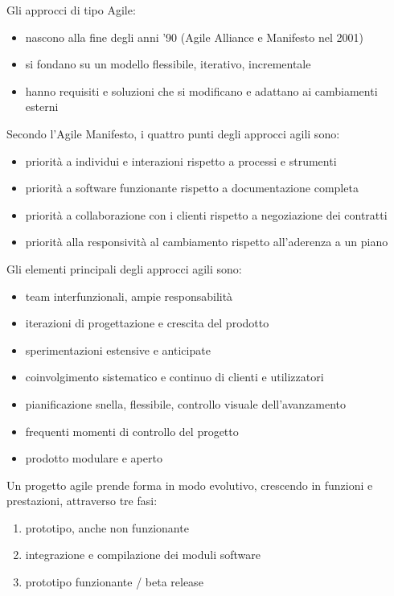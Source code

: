 \documentclass[answers, a4paper, 11pt]{exam}
\begin{document}
Gli approcci di tipo Agile:

\begin{itemize}
    \item nascono alla fine degli anni '90 (Agile Alliance e Manifesto nel 2001)
    \item si fondano su un modello flessibile, iterativo, incrementale
    \item hanno requisiti e soluzioni che si modificano e adattano ai cambiamenti esterni
    \end{itemize}
    
Secondo l'Agile Manifesto, i quattro punti degli approcci agili sono:

\begin{itemize}
    \item priorità a individui e interazioni rispetto a processi e strumenti
    \item priorità a software funzionante rispetto a documentazione completa
    \item priorità a collaborazione con i clienti rispetto a negoziazione dei contratti
    \item priorità alla responsività al cambiamento rispetto all'aderenza a un piano
\end{itemize}

Gli elementi principali degli approcci agili sono:

\begin{itemize}
    \item team interfunzionali, ampie responsabilità
    \item iterazioni di progettazione  e crescita del prodotto
    \item sperimentazioni estensive e anticipate
    \item coinvolgimento sistematico e continuo di clienti e utilizzatori
    \item pianificazione snella, flessibile, controllo visuale dell'avanzamento
    \item frequenti momenti di controllo del progetto
    \item prodotto modulare e aperto
\end{itemize}

Un progetto agile prende forma in modo evolutivo, crescendo in funzioni e prestazioni, attraverso tre fasi:

\begin{enumerate}
    \item prototipo, anche non funzionante
    \item integrazione e compilazione dei moduli software
    \item prototipo funzionante / beta release
\end{enumerate}
\end{document}
